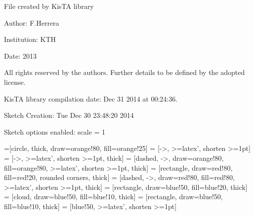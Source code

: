 \documentclass[a4paper,10pt]{article}
\begin{document}
File created by KisTA library

Author: F.Herrera

Institution: KTH

Date: 2013

All rights reserved by the authors. Further details to be defined by the adopted license.

KisTA library compilation date: Dec 31 2014 at 00:24:36.


Sketch Creation: Tue Dec 30 23:48:20 2014


Sketch options enabled:
scale = 1
\hfill


=[circle, thick, draw=orange!80, fill=orange!25]
 = [->, >=latex', shorten >=1pt]
 = [->, >=latex', shorten >=1pt, thick]
 = [dashed, ->, draw=orange!80, fill=orange!80, >=latex', shorten >=1pt, thick]
 = [rectangle, draw=red!80, fill=red!20, rounded corners, thick]
 = [dashed, ->, draw=red!80, fill=red!80, >=latex', shorten >=1pt, thick]
 = [rectangle, draw=blue!50, fill=blue!20, thick]
 = [cloud, draw=blue!50, fill=blue!10, thick]
 = [rectangle, draw=blue!50, fill=blue!10, thick]
 = [blue!50, >=latex', shorten >=1pt]
\end{document}
